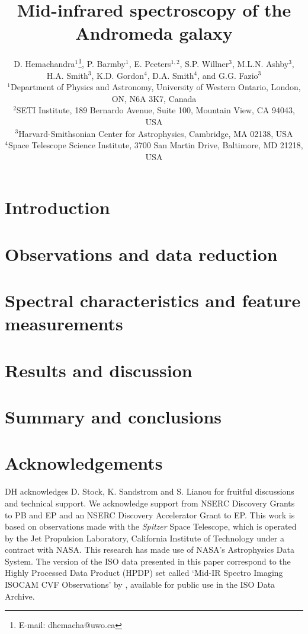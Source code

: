 \documentclass[useAMS,usenatbib,a4paper]{mn2e}
\title[Mid-infrared spectroscopy of M31]{Mid-infrared spectroscopy of the Andromeda galaxy}
\author[D. Hemachandra et al.]
{D. Hemachandra$^{1}$\thanks{E-mail: dhemacha@uwo.ca},
P. Barmby$^{1}$, 
E. Peeters$^{1,2}$, 
S.P. Willner$^{3}$, 
M.L.N. Ashby$^{3}$,
H.A. Smith$^{3}$, 
\newauthor 
K.D. Gordon$^{4}$,
D.A. Smith$^{4}$,
and
G.G. Fazio$^{3}$\\
$^{1}$Department of Physics and Astronomy, University of Western Ontario, London, ON, N6A 3K7, Canada\\
$^{2}$SETI Institute, 189 Bernardo Avenue, Suite 100, Mountain View, CA 94043, USA\\
$^{3}$Harvard-Smithsonian Center for Astrophysics, Cambridge, MA 02138, USA\\
$^{4}$Space Telescope Science Institute, 3700 San Martin Drive, Baltimore, MD 21218, USA
}
\begin{document}
\date{}

\maketitle

\label{firstpage}



\section{Introduction}



\section{Observations and data reduction}



\section{Spectral characteristics and feature measurements}
\label{sect:data_analysis}



\section{Results and discussion}



\section{Summary and conclusions}



\section*{Acknowledgements}


DH acknowledges D. Stock, K. Sandstrom and S. Lianou for fruitful discussions and technical support. 
We acknowledge support from NSERC Discovery Grants to PB and EP and an NSERC Discovery Accelerator Grant to EP. 
This work is based on observations made with the {\em Spitzer} Space Telescope, which is operated by the 
Jet Propulsion Laboratory, California Institute of Technology under a contract with NASA.
This research has made use of NASA's Astrophysics Data System.
The version of the ISO data presented in this paper correspond to the Highly Processed Data Product (HPDP) set called `Mid-IR Spectro Imaging ISOCAM CVF Observations'
by \citet{Boulanger_F_2005}, available for public use in the ISO Data Archive.



{}

\bsp

\label{lastpage}
\end{document}
